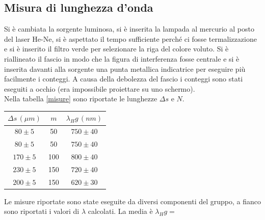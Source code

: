 \documentclass[10pt,a4paper]{article}
\begin{document}
\subsection{Misura di lunghezza d'onda}
Si è cambiata la sorgente luminosa, si è inserita la lampada al mercurio al posto del laser He-Ne, si è aspettato il tempo sufficiente perché ci fosse termalizzazione e si è inserito il filtro verde per selezionare la riga del colore voluto. Si è riallineato il fascio in modo che la figura di interferenza fosse centrale e si è inserita davanti alla sorgente una punta metallica indicatrice per eseguire più facilmente i conteggi. A causa della debolezza del fascio i conteggi sono stati eseguiti a occhio (era impossibile proiettare su uno schermo).\\
Nella tabella \ref{misure} sono riportate le lunghezze $\Delta s$ e $N$.\\

\begin{table}[!htb]
\centering
\begin{tabular}{|c|c|c|}
\hline 
$\Delta s \, (\mu m)$ & $m$ & $\lambda_Hg \, (nm) $\\ 
\hline 
$80 \pm 5$  & 50 & $750 \pm 40$\\ 
\hline 
$80 \pm 5$  & 50 & $750 \pm 40$\\ 
\hline 
$170 \pm 5$  & 100 & $800 \pm 40$\\ 
\hline 
$230 \pm 5$  & 150 & $720 \pm 40$\\ 
\hline 
$200 \pm 5$  & 150 & $620 \pm 30$\\ 
\hline 
\end{tabular} 
\end{table}


Le misure riportate sono state eseguite da diversi componenti del gruppo, a fianco sono riportati i valori di $\lambda$ calcolati. La media è $\lambda_Hg = $

\end{document}

